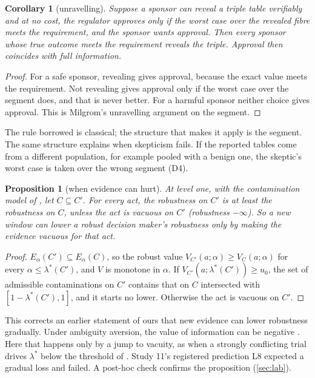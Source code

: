 \documentclass[11pt]{article}
\newtheorem{proposition}{Proposition}\newtheorem{corollary}{Corollary}\newtheorem{lemma}{Lemma}
\theoremstyle{definition}\newtheorem{definition}{Definition}\newtheorem{remark}{Remark}
\begin{document}
\begin{corollary}[unravelling]\label{cor:unravel}
Suppose a sponsor can reveal a triple table verifiably and at no cost, the regulator approves only if the worst case over the revealed
fibre meets the requirement, and the sponsor wants approval. Then every sponsor whose true outcome meets the requirement reveals the
triple. Approval then coincides with full information.
\end{corollary}

\begin{proof}
For a safe sponsor, revealing gives approval, because the exact value meets the requirement. Not revealing gives approval only if the
worst case over the segment does, and that is never better. For a harmful sponsor neither choice gives approval. This is Milgrom's
unravelling argument \cite{Milgrom1981,Grossman1981} on the segment.
\end{proof}

The rule borrowed is classical; the structure that makes it apply is the segment. The same structure explains when skepticism fails.
If the reported tables come from a different population, for example pooled with a benign one, the skeptic's worst case is taken over
the wrong segment (D4).

\begin{proposition}[when evidence can hurt]\label{prop:monotone}
At level one, with the contamination model of \cite{PG}, let $C\subseteq C'$. For every act, the robustness on $C'$ is at least the
robustness on $C$, unless the act is vacuous on $C'$ (robustness $-\infty$). So a new window can lower a robust decision maker's
robustness only by making the evidence vacuous for that act.
\end{proposition}

\begin{proof}
$E_\alpha(C')\subseteq E_\alpha(C)$, so the robust value $V_{C'}(a;\alpha)\ge V_C(a;\alpha)$ for every $\alpha\le\lambda^*(C')$, and
$V$ is monotone in $\alpha$. If $V_{C'}(a;\lambda^*(C'))\ge u_0$, the set of admissible contaminations on $C'$ contains that on $C$
intersected with $[1-\lambda^*(C'),1]$, and it starts no lower. Otherwise the act is vacuous on $C'$.
\end{proof}

This corrects an earlier statement of ours that new evidence can lower robustness gradually. Under ambiguity aversion, the value of
information can be negative \cite{AlNajjarWeinstein2009,Siniscalchi2011}. Here that happens only by a jump to vacuity, as when a
strongly conflicting trial drives $\lambda^*$ below the threshold of \cite[Prop.~33]{PG}. Study 11's registered prediction L8 expected
a gradual loss and failed. A post-hoc check confirms the proposition (\cref{sec:lab}).
\end{document}
